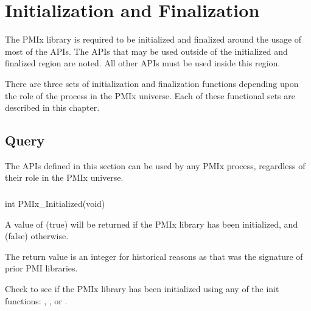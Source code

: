 \chapter{Initialization and Finalization}
\label{chap:api_init}


The \ac{PMIx} library is required to be initialized and finalized around the usage of most of the APIs.
The APIs that may be used outside of the initialized and finalized region are noted.
All other APIs must be used inside this region.

There are three sets of initialization and finalization functions depending upon the role of the process in the PMIx universe.
Each of these functional sets are described in this chapter.


\section{Query}
\label{chap:api_init:general}

The APIs defined in this section can be used by any PMIx process, regardless of their role in the PMIx universe.

\subsection{}

\format

\cspecificstart
\begin{codepar}
int PMIx_Initialized(void)
\end{codepar}
\cspecificend

A value of  (true) will be returned if the PMIx library has been initialized, and  (false) otherwise.

\rationalestart
The return value is an integer for historical reasons as that was the signature of prior PMI libraries.
\rationaleend

\descr

Check to see if the PMIx library has been initialized using any of the init functions:
, , or .

